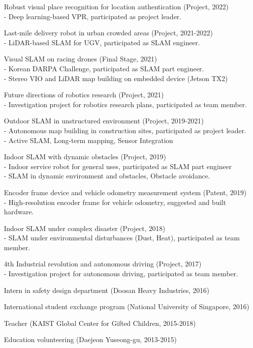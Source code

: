 \documentclass[margin]{res}
\begin{document}
\begin{resume}
		\par	Robust visual place recognition for location authentication (Project, 2022) 
		\\-	Deep learning-based VPR, participated as project leader.
		\par	Last-mile delivery robot in urban crowded areas (Project, 2021-2022) 
		\\-	LiDAR-based SLAM for UGV, participated as SLAM engineer.
		\par	Visual SLAM on racing drones (Final Stage, 2021)
		\\-	Korean DARPA Challenge, participated as SLAM part engineer.
		\\-	Stereo VIO and LiDAR map building on embedded device (Jetson TX2)
		\par	Future directions of robotics research (Project, 2021)
		\\-	Investigation project for robotics research plans, participated as team member.
		\par	Outdoor SLAM in unstructured environment (Project, 2019-2021)
		\\-	Autonomous map building in construction sites, participated as project leader.
		\\-	Active SLAM, Long-term mapping, Sensor Integration
		\par	Indoor SLAM with dynamic obstacles (Project, 2019)
		\\-	Indoor service robot for general uses, participated as SLAM part engineer
		\\-	SLAM in dynamic environment and obstacles, Obstacle avoidance.
		\par	Encoder frame device and vehicle odometry measurement system (Patent, 2019)
		\\-	High-resolution encoder frame for vehicle odometry, suggested and built hardware.
		\par	Indoor SLAM under complex disaster (Project, 2018)
		\\-	SLAM under environmental disturbances (Dust, Heat), participated as team member.
		\par	4th Industrial revolution and autonomous driving (Project, 2017)
		\\-	Investigation project for autonomous driving, participated as team member.
		\par	Intern in safety design department (Doosan Heavy Industries, 2016)
		\par	International student exchange program (National University of Singapore, 2016)
		\par	Teacher (KAIST Global Center for Gifted Children, 2015-2018)
		\par	Education volunteering (Daejeon Yuseong-gu, 2013-2015)
		

\end{resume}
\end{document}
